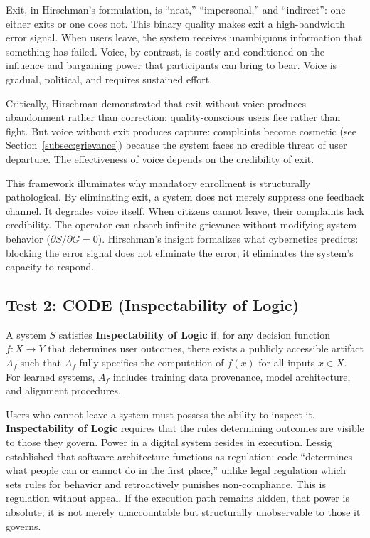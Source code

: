 Exit, in Hirschman's formulation, is ``neat,'' ``impersonal,'' and ``indirect'': one either exits or one does not. This binary quality makes exit a high-bandwidth error signal. When users leave, the system receives unambiguous information that something has failed. Voice, by contrast, is costly and conditioned on the influence and bargaining power that participants can bring to bear. Voice is gradual, political, and requires sustained effort.

Critically, Hirschman demonstrated that exit without voice produces abandonment rather than correction: quality-conscious users flee rather than fight. But voice without exit produces capture: complaints become cosmetic (see Section~\ref{subsec:grievance}) because the system faces no credible threat of user departure. The effectiveness of voice depends on the credibility of exit.

This framework illuminates why mandatory enrollment is structurally pathological. By eliminating exit, a system does not merely suppress one feedback channel. It degrades voice itself. When citizens cannot leave, their complaints lack credibility. The operator can absorb infinite grievance without modifying system behavior ($\partial S / \partial G = 0$). Hirschman's insight formalizes what cybernetics predicts: blocking the error signal does not eliminate the error; it eliminates the system's capacity to respond.

\subsection{Test 2: CODE (Inspectability of Logic)}

\begin{definition}[CODE]
\label{def:code}
A system $S$ satisfies \textbf{Inspectability of Logic} if, for any decision function $f: X \to Y$ that determines user outcomes, there exists a publicly accessible artifact $A_f$ such that $A_f$ fully specifies the computation of $f(x)$ for all inputs $x \in X$. For learned systems, $A_f$ includes training data provenance, model architecture, and alignment procedures.
\end{definition}

Users who cannot leave a system must possess the ability to inspect it. \textbf{Inspectability of Logic} requires that the rules determining outcomes are visible to those they govern. Power in a digital system resides in execution. Lessig \citep{lessig2006} established that software architecture functions as regulation: code ``determines what people can or cannot do in the first place,'' unlike legal regulation which sets rules for behavior and retroactively punishes non-compliance. This is regulation without appeal. If the execution path remains hidden, that power is absolute; it is not merely unaccountable but structurally unobservable to those it governs.

